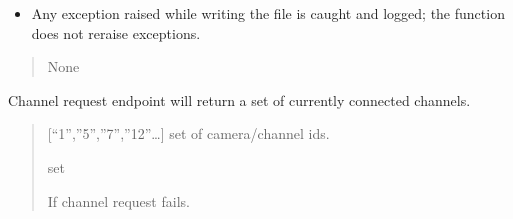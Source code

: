 \documentclass[letterpaper,10pt,english]{sphinxmanual}
\begin{document}
\begin{fulllineitems}
\begin{description}
\begin{itemize}
\end{itemize}

\begin{itemize}
\item {} 
\sphinxAtStartPar
Any exception raised while writing the file is caught and logged; the
function does not re\sphinxhyphen{}raise exceptions.

\end{itemize}

\end{description}
\begin{quote}\begin{description}
\sphinxAtStartPar
None

\end{description}\end{quote}

\end{fulllineitems}


\begin{fulllineitems}
\label{\detokenize{modules/src.data_intake.data_intake.NVRConnection:src.data_intake.data_intake.NVRConnection.channels}}
\pysigstartsignatures
\pysiglinewithargsret
{}
{}
{}
\pysigstopsignatures
\sphinxAtStartPar
Channel request endpoint will return a set of currently connected channels.
\begin{quote}\begin{description}
\sphinxAtStartPar
{[}“1”,”5”,”7”,”12”…{]} set of camera/channel ids.

\sphinxAtStartPar
set

\sphinxAtStartPar
{} \textendash{} If channel request fails.

\end{description}\end{quote}

\end{fulllineitems}
\end{document}
